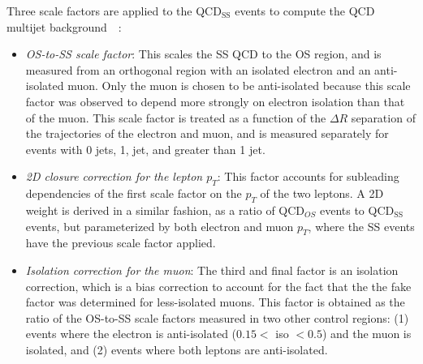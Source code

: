 Three scale factors are applied to the QCD$_{\text{SS}}$ events to compute the QCD multijet background~\cite{CMS-HIG-17-024}~\cite{CMS-HIG-22-007}:
\begin{itemize}
    \item \textit{OS-to-SS scale factor}: This scales the SS QCD to the OS region, and is measured from an orthogonal region with an isolated electron and an anti-isolated muon. Only the muon is chosen to be anti-isolated because this scale factor was observed to depend more strongly on electron isolation than that of the muon. This scale factor is treated as a function of the $\Delta R$ separation of the trajectories of the electron and muon, and is measured separately for events with 0 jets, 1, jet, and greater than 1 jet.
    \item \textit{2D closure correction for the lepton $p_{T}$}: This factor accounts for subleading dependencies of the first scale factor on the $p_{T}$ of the two leptons. A 2D weight is derived in a similar fashion, as a ratio of QCD$_{OS}$ events to QCD$_{\text{SS}}$ events, but parameterized by both electron and muon $p_{T}$, where the SS events have the previous scale factor applied.
    \item \textit{Isolation correction for the muon}: The third and final factor is an isolation correction, which is a bias correction to account for the fact that the the fake factor was determined for less-isolated muons. This factor is obtained as the ratio of the OS-to-SS scale factors measured in two other control regions: (1) events where the electron is anti-isolated ($0.15 <$ iso $< 0.5$) and the muon is isolated, and (2) events where both leptons are anti-isolated. 
\end{itemize}